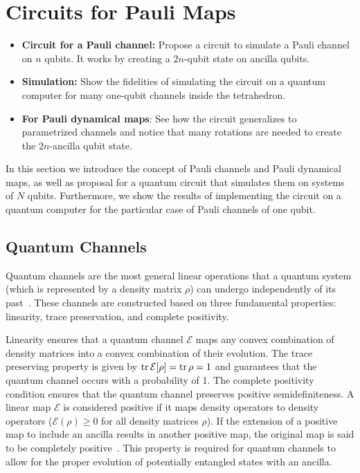 \section{Circuits for Pauli Maps}
\label{sec: Circuits for Pauli Maps}

\begin{itemize}
\item \textbf{Circuit for a Pauli channel:}  Propose a circuit to simulate a Pauli channel on $n$ qubits. It works by creating a $2n$-qubit state on ancilla qubits.
\item \textbf{Simulation:} Show the fidelities of simulating the circuit on a quantum computer for many one-qubit channels inside the tetrahedron.
\item \textbf{For Pauli dynamical maps}: See how the circuit generalizes to parametrized channels and notice that many rotations are needed to create the $2n$-ancilla qubit state. \\
\end{itemize}

In this section we introduce the concept of Pauli channels and 
Pauli dynamical maps, as well as proposal for a quantum circuit that simulates them on systems of $N$ qubits. 
Furthermore, we show the results of implementing the circuit on a 
quantum computer for the particular case of Pauli channels of one qubit. 

\subsection{Quantum Channels}
\label{subsec: Quantum Channels}
Quantum channels are the most general linear operations that a 
quantum system (which is represented by a density matrix $\rho$) 
can undergo independently of its past~\cite{zimansbook,cirac}. 
These channels are constructed based on three fundamental properties: 
linearity, trace preservation, and complete positivity.

Linearity ensures that a quantum channel $\mathcal{E}$ maps any convex combination 
of density matrices into a convex combination of their evolution. 
The trace preserving property is given by $\mathop{\mathrm{tr}}\nolimits \mathcal{E}[\rho] = \mathop{\mathrm{tr}}\nolimits \rho = 1$ 
and guarantees that the quantum channel occurs with a probability of 1. 
The complete positivity condition ensures that the quantum channel preserves positive semidefiniteness. 
A linear map $\mathcal{E}$ is considered positive if it maps density operators to density operators 
($\mathcal{E}(\rho) \geq 0$  for all density matrices $\rho$). 
If the extension of a positive map to include an ancilla results in another positive map, 
the original map is said to be completely positive~\cite{geometry}. 
This property is required for quantum channels to allow for the
proper evolution of potentially entangled states with an ancilla.

